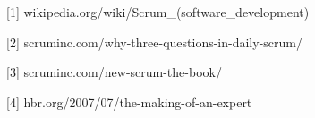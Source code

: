 \documentclass{article}
\begin{document}
\hspace{3.6cm} [1] 
\hspace{1mm} wikipedia.org/wiki/Scrum\_(software\_development)

\hspace{3cm} [2] 
\hspace{1mm} scruminc.com/why-three-questions-in-daily-scrum/

\hspace{3cm} [3] 
\hspace{1mm} scruminc.com/new-scrum-the-book/

\hspace{3cm} [4] 
\hspace{1mm} hbr.org/2007/07/the-making-of-an-expert
\end{document}
